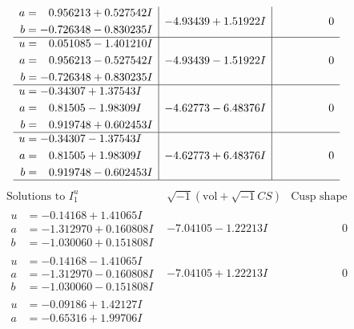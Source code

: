 \documentclass[1p]{elsarticle_modified}
\theoremstyle{definition}
\newcommand{\I}{\sqrt{-1}}
\begin{document}
$$\begin{array}{c|c|c}
\begin{aligned}
a &= \phantom{-}0.956213 + 0.527542 I \\
b &= -0.726348 - 0.830235 I\end{aligned}
 & -4.93439 + 1.51922 I & \phantom{-0.000000 } 0 \\ \hline\begin{aligned}
u &= \phantom{-}0.051085 - 1.401210 I \\
a &= \phantom{-}0.956213 - 0.527542 I \\
b &= -0.726348 + 0.830235 I\end{aligned}
 & -4.93439 - 1.51922 I & \phantom{-0.000000 } 0 \\ \hline\begin{aligned}
u &= -0.34307 + 1.37543 I \\
a &= \phantom{-}0.81505 - 1.98309 I \\
b &= \phantom{-}0.919748 + 0.602453 I\end{aligned}
 & -4.62773 - 6.48376 I & \phantom{-0.000000 } 0 \\ \hline\begin{aligned}
u &= -0.34307 - 1.37543 I \\
a &= \phantom{-}0.81505 + 1.98309 I \\
b &= \phantom{-}0.919748 - 0.602453 I\end{aligned}
 & -4.62773 + 6.48376 I & \phantom{-0.000000 } 0\\
 \hline 
 \end{array}$$\newpage$$\begin{array}{c|c|c}  
\text{Solutions to }I^u_{1}& \I (\text{vol} + \sqrt{-1}CS) & \text{Cusp shape}\\
 \hline 
\begin{aligned}
u &= -0.14168 + 1.41065 I \\
a &= -1.312970 + 0.160808 I \\
b &= -1.030060 + 0.151808 I\end{aligned}
 & -7.04105 - 1.22213 I & \phantom{-0.000000 } 0 \\ \hline\begin{aligned}
u &= -0.14168 - 1.41065 I \\
a &= -1.312970 - 0.160808 I \\
b &= -1.030060 - 0.151808 I\end{aligned}
 & -7.04105 + 1.22213 I & \phantom{-0.000000 } 0 \\ \hline\begin{aligned}
u &= -0.09186 + 1.42127 I \\
a &= -0.65316 + 1.99706 I \\

\end{aligned}
\end{array}$$
\end{document}
